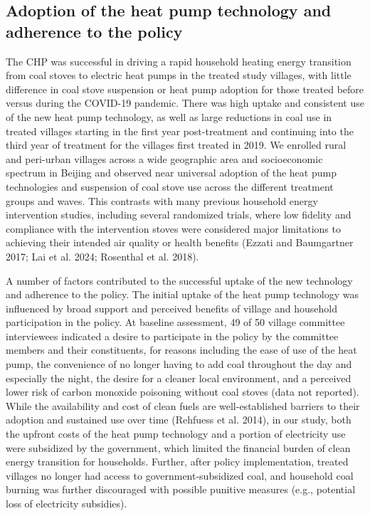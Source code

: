 \documentclass[
  letterpaper,
  DIV=11,
  numbers=noendperiod]{scrartcl}
\begin{document}
\subsection{Adoption of the heat pump technology and adherence to the
policy}\label{adoption-of-the-heat-pump-technology-and-adherence-to-the-policy}

The CHP was successful in driving a rapid household heating energy
transition from coal stoves to electric heat pumps in the treated study
villages, with little difference in coal stove suspension or heat pump
adoption for those treated before versus during the COVID-19 pandemic.
There was high uptake and consistent use of the new heat pump
technology, as well as large reductions in coal use in treated villages
starting in the first year post-treatment and continuing into the third
year of treatment for the villages first treated in 2019. We enrolled
rural and peri-urban villages across a wide geographic area and
socioeconomic spectrum in Beijing and observed near universal adoption
of the heat pump technologies and suspension of coal stove use across
the different treatment groups and waves. This contrasts with many
previous household energy intervention studies, including several
randomized trials, where low fidelity and compliance with the
intervention stoves were considered major limitations to achieving their
intended air quality or health benefits (Ezzati and Baumgartner 2017;
Lai et al. 2024; Rosenthal et al. 2018).

A number of factors contributed to the successful uptake of the new
technology and adherence to the policy. The initial uptake of the heat
pump technology was influenced by broad support and perceived benefits
of village and household participation in the policy. At baseline
assessment, 49 of 50 village committee interviewees indicated a desire
to participate in the policy by the committee members and their
constituents, for reasons including the ease of use of the heat pump,
the convenience of no longer having to add coal throughout the day and
especially the night, the desire for a cleaner local environment, and a
perceived lower risk of carbon monoxide poisoning without coal stoves
(data not reported). While the availability and cost of clean fuels are
well-established barriers to their adoption and sustained use over time
(Rehfuess et al. 2014), in our study, both the upfront costs of the heat
pump technology and a portion of electricity use were subsidized by the
government, which limited the financial burden of clean energy
transition for households. Further, after policy implementation, treated
villages no longer had access to government-subsidized coal, and
household coal burning was further discouraged with possible punitive
measures (e.g., potential loss of electricity subsidies).
\end{document}
